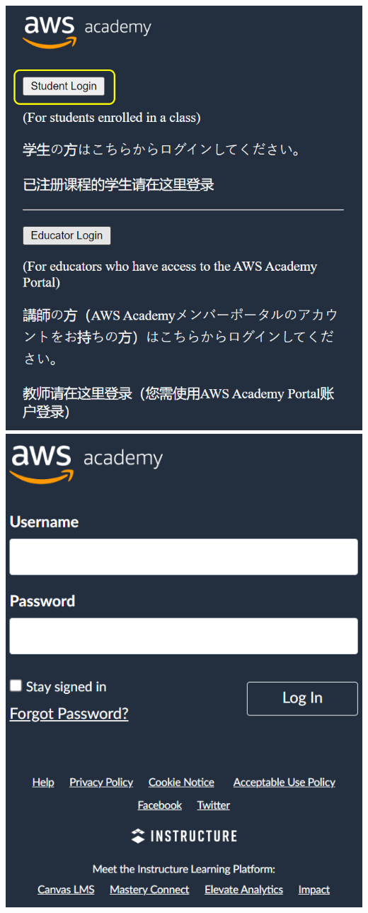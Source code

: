 \documentclass{csse4400}
\begin{document}
\begin{enumerate}
    \hspace{9mm}
    \includegraphics[height=0.35\textheight]{images/labs-login1}
    \hspace{5mm}
    \includegraphics[height=0.35\textheight]{images/labs-login2}
\end{enumerate}
\end{document}
